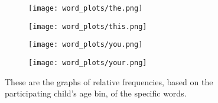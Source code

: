 \documentclass{article}
\theoremstyle{plain}
\theoremstyle{definition}
\theoremstyle{remark}
\numberwithin{equation}{section}
\begin{document}
\begin{figure}
\begin{subfigure}[b]{0.3\textwidth}
        \texttt{[image: word\_plots/the.png]}
        \label{fig:the}
    \end{subfigure}
    \begin{subfigure}[b]{0.3\textwidth}
        \texttt{[image: word\_plots/this.png]}
        \label{fig:this}
    \end{subfigure}
     \begin{subfigure}[b]{0.3\textwidth}
        \texttt{[image: word\_plots/you.png]}
        \label{fig:you}
    \end{subfigure}
    \begin{subfigure}[b]{0.3\textwidth}
        \texttt{[image: word\_plots/your.png]}
        \label{fig:your}
    \end{subfigure}
    \caption{These are the graphs of relative frequencies, based on the participating child's age bin, of the specific words.}
    \label{fig:word}
\end{figure}
\end{document}
